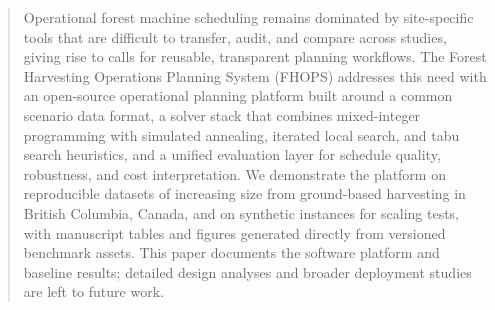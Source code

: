 \begin{abstract}
Operational forest machine scheduling remains dominated by site-specific tools that are difficult to transfer, audit, and compare across studies, giving rise to calls for reusable, transparent planning workflows. The Forest Harvesting Operations Planning System (FHOPS) addresses this need with an open-source operational planning platform built around a common scenario data format, a solver stack that combines mixed-integer programming with simulated annealing, iterated local search, and tabu search heuristics, and a unified evaluation layer for schedule quality, robustness, and cost interpretation. We demonstrate the platform on reproducible datasets of increasing size from ground-based harvesting in British Columbia, Canada, and on synthetic instances for scaling tests, with manuscript tables and figures generated directly from versioned benchmark assets. This paper documents the software platform and baseline results; detailed design analyses and broader deployment studies are left to future work.
\end{abstract}
